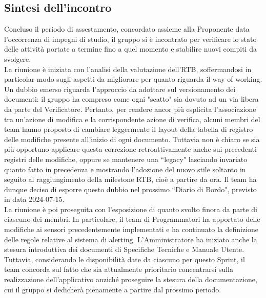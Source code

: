 \documentclass[8pt]{article}
\begin{document}
\subsection{Sintesi dell'incontro}
Concluso il periodo di assestamento, concordato assieme alla Proponente data l'occorrenza di impegni di studio, il gruppo si è incontrato per verificare lo stato delle attività portate a termine fino a quel momento e stabilire nuovi compiti da svolgere. \\
La riunione è iniziata con l'analisi della valutazione dell'RTB, soffermandosi in particolar modo sugli aspetti da migliorare per quanto riguarda il way of working. Un dubbio emerso riguarda l'approccio da adottare sul versionamento dei documenti: il gruppo ha compreso come ogni "scatto" sia dovuto ad un via libera da parte del Verificatore. Pertanto, per rendere ancor più esplicita l'associazione tra un'azione di modifica e la corrispondente azione di verifica, alcuni membri del team hanno proposto di cambiare leggermente il layout della tabella di registro delle modifiche presente all'inizio di ogni documento. 
Tuttavia non è chiaro se sia più opportuno applicare questa correzione retroattivamente anche sui precedenti registri delle modifiche, oppure se mantenere una ``legacy" lasciando invariato quanto fatto in precedenza e mostrando l'adozione del nuovo stile soltanto in seguito al raggiungimento della milestone RTB, cioè a partire da ora. Il team ha dunque deciso di esporre questo dubbio nel prossimo ``Diario di Bordo", previsto in data 2024-07-15. \\
La riunione è poi proseguita con l'esposizione di quanto svolto finora da parte di ciascuno dei membri. In particolare, il team di Programmatori ha apportato delle modifiche ai sensori precedentemente implementati e ha continuato la definizione delle regole relative al sistema di alerting. L'Amministratore ha iniziato anche la stesura introduttiva dei documenti di Specifiche Tecniche e Manuale Utente. Tuttavia, considerando le disponibilità date da ciascuno per questo Sprint, il team concorda sul fatto che sia attualmente prioritario concentrarsi sulla realizzazione dell'applicativo anziché proseguire la stesura della documentazione, cui il gruppo si dedicherà pienamente a partire dal prossimo periodo.\\ 
\end{document}
